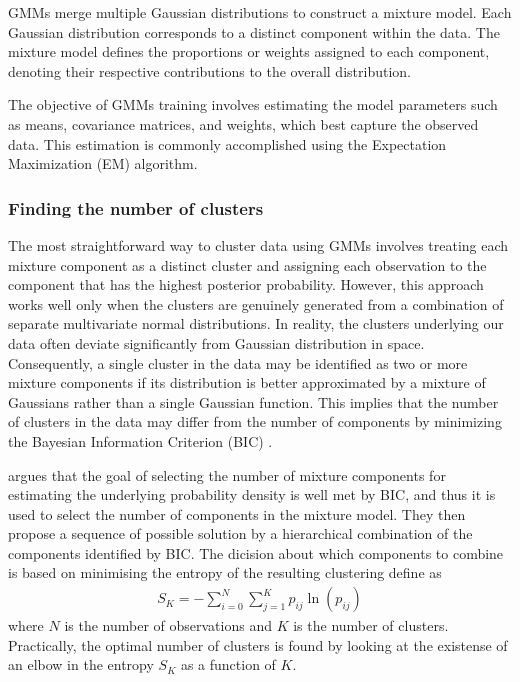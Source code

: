 \documentclass{article}
\begin{document}
GMMs merge multiple Gaussian distributions to construct a mixture model. Each Gaussian distribution corresponds to a distinct component within the data. The mixture model defines the proportions or weights assigned to each component, denoting their respective contributions to the overall distribution.

The objective of GMMs training involves estimating the model parameters such as means, covariance matrices, and weights, which best capture the observed data. This estimation is commonly accomplished using the Expectation Maximization (EM) algorithm.


\subsubsection{Finding the number of clusters}

The most straightforward way to cluster data using GMMs involves treating each mixture component as a distinct cluster and assigning each observation to the component that has the highest posterior probability. However, this approach works well only when the clusters are genuinely generated from a combination of separate multivariate normal distributions. In reality, the clusters underlying our data often deviate significantly from Gaussian distribution in space. Consequently, a single cluster in the data may be identified as two or more mixture components if its distribution is better approximated by a mixture of Gaussians rather than a single Gaussian function. This implies that the number of clusters in the data may differ from the number of components by minimizing the Bayesian Information Criterion (BIC) \cite{bic}.

\cite{clustering} argues that the goal of selecting the number of mixture components for estimating the underlying probability density is well met by BIC, and thus it is used to select the number of components in the mixture model. They then propose a sequence of possible solution by a hierarchical combination of the components identified by BIC. 
The dicision about which components to combine is based on minimising the entropy of the resulting clustering define as
\begin{align}
	S_K=-\sum_{i=0}^N\sum_{j=1}^K p_{ij}\ln(p_{ij})
\end{align}
where $N$ is the number of observations and $K$ is the number of clusters. Practically, the optimal number of clusters is found by looking at the existense of an elbow in the entropy $S_K$ as a function of $K$.
\end{document}
